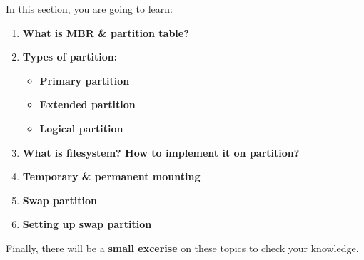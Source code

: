 \setlength{\columnsep}{3pt}
\begin{flushleft}
	\bigskip
	\bigskip
	\begin{tcolorbox}[breakable,notitle,boxrule=1pt,colback=black,colframe=black]
		\color{white}
		\bigskip
		In this section, you are going to learn:
		\begin{enumerate}
			\item \textbf{What is MBR \& partition table?}
			\item \textbf{Types of partition:}
			\begin{itemize}
	 			\item \textbf{Primary partition}
				\item \textbf{Extended partition}
				\item \textbf{Logical partition}
			\end{itemize}
			\item \textbf{What is filesystem? How to implement it on partition?}
			\item \textbf{Temporary \& permanent mounting}
			\item \textbf{Swap partition}
			\item \textbf{Setting up swap partition}
		\end{enumerate}	
		\bigskip
		Finally, there will be a \textbf{small excerise} on these topics to check your knowledge.
		\bigskip
	\end{tcolorbox}
	

	
	\begin{multicols}{2}
		\vspace*{\fill}
		\vspace*{\fill}
		\vspace*{\fill}
		\vspace*{\fill}
		\vspace*{\fill}
		\vspace*{\fill}
		\vspace*{\fill}
		\vspace*{\fill}
		\vspace*{\fill}
		

\end{multicols}
\end{flushleft}
